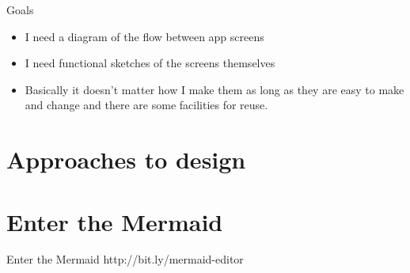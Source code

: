 \documentclass[aspectratio=43,handout,bigger]{beamer}
\begin{document}

\begin{frame}{Goals}
  \begin{itemize}
    \item I need a diagram of the flow between app screens
    \item I need functional sketches of the screens themselves
    \item Basically it doesn't matter how I make them as long
          as they are easy to make and change and there are some
          facilities for reuse.
  \end{itemize}
\end{frame}

\section{Approaches to design}


\section{Enter the Mermaid}

\begin{frame}{Enter the Mermaid}
  http://bit.ly/mermaid-editor

\end{frame}
\end{document}

